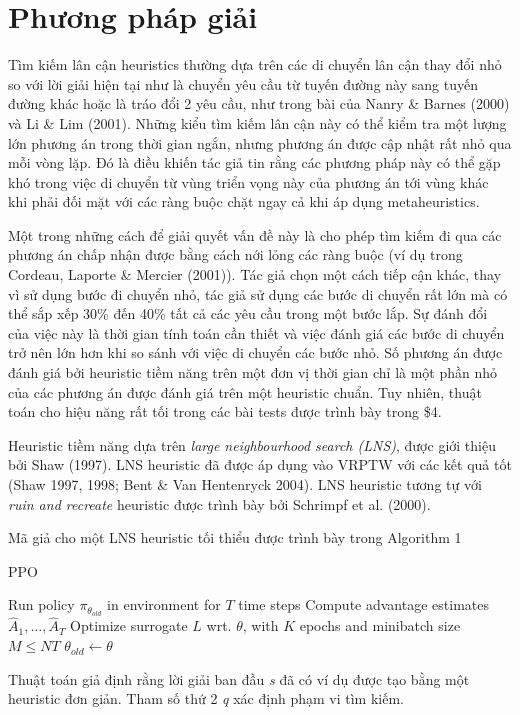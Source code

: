 \chapter{Phương pháp giải}
Tìm kiếm lân cận heuristics thường dựa trên các di chuyển lân cận thay đổi nhỏ so với lời giải hiện tại như là chuyển yêu cầu từ tuyến đường này sang tuyến đường khác hoặc là tráo đổi 2 yêu cầu, như trong bài của Nanry \& Barnes (2000) và Li \& Lim (2001). Những kiểu tìm kiếm lân cận này có thể kiểm tra một lượng lớn phương án trong thời gian ngắn, nhưng phương án được cập nhật rất nhỏ qua mỗi vòng lặp. Đó là điều khiến tác giả tin rằng các phương pháp này có thể gặp khó trong việc di chuyển từ vùng triển vọng này của phương án tới vùng khác khi phải đối mặt với các ràng buộc chặt ngay cả khi áp dụng metaheuristics.

Một trong những cách để giải quyết vấn đề này là cho phép tìm kiếm đi qua các phương án chấp nhận được bằng cách nới lỏng các ràng buộc (ví dụ trong Cordeau, Laporte \& Mercier (2001)). Tác giả chọn một cách tiếp cận khác, thay vì sử dụng bước đi chuyển nhỏ, tác giả sử dụng các bước di chuyển rất lớn mà có thể sắp xếp 30\% đến 40\% tất cả các yêu cầu trong một bước lắp. Sự đánh đổi của việc này là thời gian tính toán cần thiết và việc đánh giá các bước di chuyển trở nên lớn hơn khi so sánh với việc di chuyển các bước nhỏ. Số phương án được đánh giá bởi heuristic tiềm năng trên một đơn vị thời gian chỉ là một phần nhỏ của các phương án được đánh giá trên một heuristic chuẩn. Tuy nhiên, thuật toán cho hiệu năng rất tối trong các bài tests được trình bày trong \$4.

Heuristic tiềm năng dựa trên \textit{large neighbourhood search (LNS)}, được giới thiệu bởi Shaw (1997). LNS heuristic đã được áp dụng vào VRPTW với các kết quả tốt (Shaw 1997, 1998; Bent \& Van Hentenryck 2004). LNS heuristic tương tự với \textit{ruin and recreate} heuristic được trình bày bởi Schrimpf et al. (2000).

Mã giả cho một LNS heuristic tối thiểu được trình bày trong Algorithm 1

\begin{algorithm}
	\caption{PPO} 
	\begin{algorithmic}[1]
				\State Run policy $\pi_{\theta_{old}}$ in environment for $T$ time steps
				\State Compute advantage estimates $\hat{A}_{1},\ldots,\hat{A}_{T}$
			\EndFor
			\State Optimize surrogate $L$ wrt. $\theta$, with $K$ epochs and minibatch size $M\leq NT$
			\State $\theta_{old}\leftarrow\theta$
		\EndFor
	\end{algorithmic} 
\end{algorithm}
Thuật toán giả định rằng lời giải ban đầu \textit{s} đã có ví dụ được tạo bằng một heuristic đơn giản. Tham số thứ 2 \textit{q} xác định phạm vi tìm kiếm. 

